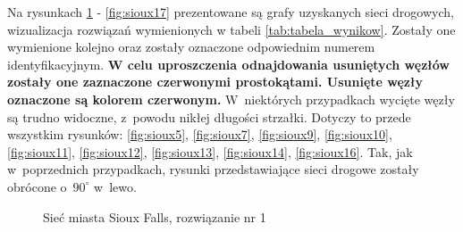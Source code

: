 \documentclass[twoside,12pt]{report}
\begin{document}
Na rysunkach \ref{fig:sioux1} - \ref{fig:sioux17} prezentowane są grafy uzyskanych sieci drogowych, wizualizacja rozwiązań wymienionych w tabeli \ref{tab:tabela_wynikow}. Zostały one wymienione kolejno oraz zostały oznaczone odpowiednim numerem identyfikacyjnym. \textbf{W celu uproszczenia odnajdowania usuniętych węzłów zostały one zaznaczone czerwonymi prostokątami. Usunięte węzły oznaczone są kolorem czerwonym.}  W~niektórych przypadkach wycięte węzły są trudno widoczne, z~powodu nikłej długości strzałki. Dotyczy to przede wszystkim rysunków: \ref{fig:sioux5}, \ref{fig:sioux7}, \ref{fig:sioux9}, \ref{fig:sioux10}, \ref{fig:sioux11}, \ref{fig:sioux12}, \ref{fig:sioux13}, \ref{fig:sioux14}, \ref{fig:sioux16}. Tak, jak w~poprzednich przypadkach, rysunki przedstawiające sieci drogowe zostały obrócone o~$90^{\circ}$ w~lewo. 


\begin{figure}[htbp]
\centering
{}
\caption{Sieć miasta Sioux Falls, rozwiązanie nr 1}
\label{fig:sioux1}
\end{figure}
\end{document}
